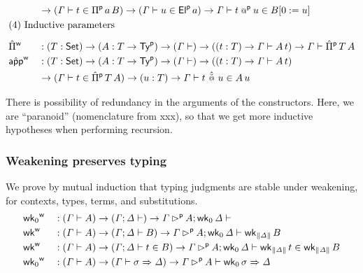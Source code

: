 \begin{definition}
\begin{alignat*}{5}
    & &&
    \ra(\GG \vdash t \in \Piu \, a \, B )
    \ra
    (\GG \vdash u \in \Elu\,a)
    \ra
    \GG \vdash t \appu u \in  B [0 := u] \\
  & \rlap{(4) Inductive parameters} \\[0.5em]
  & \Pimw && :
    (T:\Set)\ra(A : T\ra \Tyu)\ra(\GG \vdash)\ra
    ((t : T)\ra\GG\vdash A\,t) \ra
    \GG \vdash \Pimu \,T\,A
    \\
    & \appmw  && :
    (T:\Set)\ra(A : T\ra \Tyu)\ra(\GG \vdash)\ra
    ((t : T)\ra\GG\vdash A\,t)
    \\
    & &&
    \ra(\GG \vdash t \in \Pimu \,T\,A)
    \ra (u : T) \ra \GG \vdash t\,\appmu\,u \in A\,u
  \end{alignat*}
\end{definition}
There is possibility of redundancy in the arguments of the constructors. Here,
we are ``{paranoid}'' (nomenclature from xxx), so that we get more inductive hypotheses when performing
recursion.


\subsubsection{Weakening preserves typing}
\label{lem:weaken-typing}
We prove by mutual induction that typing judgments are stable under weakening,
for contexts, types, terms, and substitutions.
\begin{alignat*}{5}
  & {\mathsf{wk}_0}^{\mathsf{w}} && : (\mathit{\Gamma} \vdash A)\rightarrow(\mathit{\Gamma} ; \mathit{\Delta}\vdash) \rightarrow
  \mathit{\Gamma} \mathbin{{\rhd}^{\mathsf{p}}} A ; \mathsf{wk}_0\, \mathit{\Delta} \vdash \\
  & {\mathsf{wk}}^{\mathsf{w}} && : (\mathit{\Gamma} \vdash A)\rightarrow(\mathit{\Gamma} ; \mathit{\Delta}\vdash B) \rightarrow
  \mathit{\Gamma} \mathbin{{\rhd}^{\mathsf{p}}} A ; \mathsf{wk}_0\,\mathit{\Delta} \vdash \mathsf{wk}_{\| \mathit{\Delta} \|}\, B  \\
  & {\mathsf{wk}}^{\mathsf{w}} && : (\mathit{\Gamma} \vdash A)\rightarrow(\mathit{\Gamma} ; \mathit{\Delta}\vdash t\in B) \rightarrow
  \mathit{\Gamma} \mathbin{{\rhd}^{\mathsf{p}}} A ; \mathsf{wk}_0\,\mathit{\Delta} \vdash \mathsf{wk}_{\| \mathit{\Delta} \|}\, t \in \mathsf{wk}_{\| \mathit{\Delta} \|}\,B  \\
  & {\mathsf{wk}_0}^{\mathsf{w}} && : (\mathit{\Gamma} \vdash A)\rightarrow(\mathit{\Gamma} \vdash \sigma
  \Rightarrow \mathit{\Delta}) \rightarrow
  \mathit{\Gamma} \mathbin{{\rhd}^{\mathsf{p}}} A \vdash \mathsf{wk}_0\, \sigma \Rightarrow \mathit{\Delta}
  \end{alignat*}
